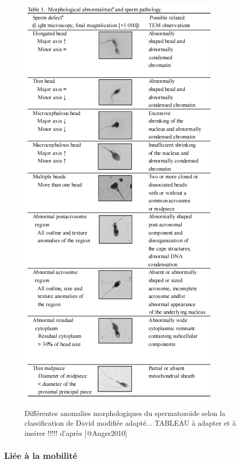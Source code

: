 \documentclass[12pt,twoside]{reedthesis}
\theoremstyle{definition}
\theoremstyle{definition}
\theoremstyle{remark}
\begin{document}
  \begin{figure}
  
  {\centering \includegraphics[scale=.75]{figure/sperm_morpho_abnormalities} 
  
  }
  
  \caption[Différentes anomalies morphologiques du spermatozoïde selon la classification de David modifiée adapté... TABLEAU à adapter et à insérer !!!!!]{Différentes anomalies morphologiques du spermatozoïde selon la classification de David modifiée adapté... TABLEAU à adapter et à insérer !!!!! d'après [@Auger2010]}\label{fig:anomaliemorphosperm}
  \end{figure}
  
  \subsubsection{Liée à la mobilité}\label{liee-a-la-mobilite}
  
\end{document}

